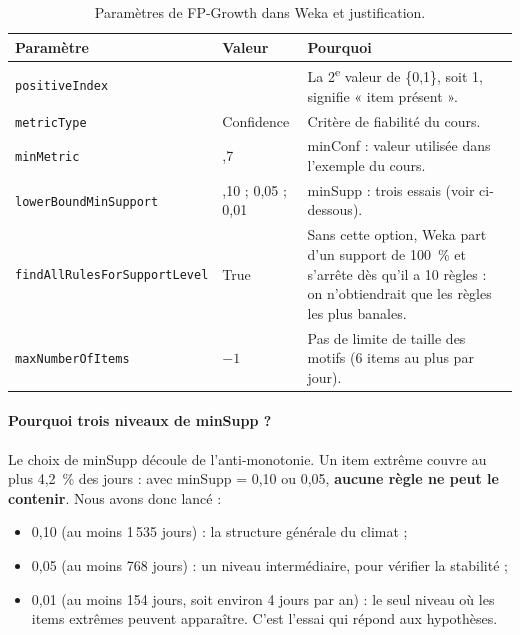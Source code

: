 \documentclass[12pt, a4paper]{article}
\begin{document}
\begin{table}[H]
\centering
\caption{Paramètres de FP-Growth dans Weka et justification.}
\label{tab:config}
\footnotesize
{}
\begin{tabular}{>{\raggedright\arraybackslash}p{4.6cm}>{\raggedright\arraybackslash}p{2.1cm}p{7.5cm}}
\toprule
\rowcolor{NuitBleue!90}
\color{white}\textbf{Paramètre} & \color{white}\textbf{Valeur} & \color{white}\textbf{Pourquoi} \\
\midrule
\texttt{positiveIndex} & 2 & La 2\textsuperscript{e} valeur de \{0,1\}, soit 1, signifie « item présent ». \\
\texttt{metricType} & Confidence & Critère de fiabilité du cours. \\
\texttt{minMetric} & 0,7 & minConf : valeur utilisée dans l'exemple du cours. \\
\texttt{lowerBoundMinSupport} & 0,10 ; 0,05 ; 0,01 & minSupp : trois essais (voir ci-dessous). \\
\texttt{findAllRules}\newline\texttt{ForSupportLevel} & True & Sans cette option, Weka part d'un support de 100~\% et s'arrête dès qu'il a 10 règles : on n'obtiendrait que les règles les plus banales. \\
\texttt{maxNumberOfItems} & $-1$ & Pas de limite de taille des motifs (6 items au plus par jour). \\
\bottomrule
\end{tabular}
\end{table}

\paragraph{Pourquoi trois niveaux de minSupp ?} Le choix de minSupp découle de
l'anti-monotonie. Un item extrême couvre au plus 4,2~\% des jours : avec minSupp = 0,10 ou
0,05, \textbf{aucune règle ne peut le contenir}. Nous avons donc lancé :
\begin{itemize}
  \item 0,10 (au moins 1\,535 jours) : la structure générale du climat ;
  \item 0,05 (au moins 768 jours) : un niveau intermédiaire, pour vérifier la stabilité ;
  \item 0,01 (au moins 154 jours, soit environ 4 jours par an) : le seul niveau où les items
        extrêmes peuvent apparaître. C'est l'essai qui répond aux hypothèses.
\end{itemize}
\end{document}
